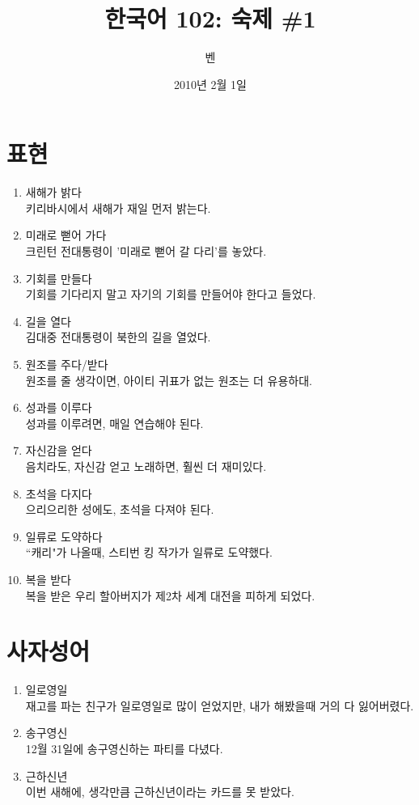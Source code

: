 \documentclass{article}
\title{한국어 102: 숙제 \#1}
\author{벤}
\date{2010년 2월 1일}
\begin{document}
\maketitle
\thispagestyle{empty}
\pagestyle{empty}

\section{표현}
\begin{enumerate}
  \item 새해가 밝다 \\
키리바시에서 새해가 재일 먼저 밝는다.

  \item 미래로 뻗어 가다 \\
크린턴 전대통령이 '미래로 뻗어 갈 다리'를 놓았다.

  \item 기회를 만들다 \\
기회를 기다리지 말고 자기의 기회를 만들어야 한다고 들었다.

  \item 길을 열다 \\
김대중 전대통령이 북한의 길을 열었다.

  \item 원조를 주다/받다 \\
원조를 줄 생각이면, 아이티 귀표가 없는 원조는 더 유용하대.

  \item 성과를 이루다 \\
성과를 이루려면, 매일 연습해야 된다.

  \item 자신감을 얻다 \\
음치라도, 자신감 얻고 노래하면, 훨씬 더 재미있다.

  \item 초석을 다지다 \\
으리으리한 성에도,  초석을 다져야 된다.

  \item 일류로 도약하다 \\
``캐리"가 나올때, 스티번 킹 작가가 일류로 도약했다.

  \item 복을 받다 \\
복을 받은 우리 할아버지가 제2차 세계 대전을 피하게 되었다.
\end{enumerate}

\section{사자성어}
\begin{enumerate}
  \item 일로영일 \\
재고를 파는 친구가 일로영일로 많이 얻었지만, 내가 해봤을때 거의 다 잃어버렸다.

  \item 송구영신 \\
12월 31일에 송구영신하는 파티를 다녔다.

  \item 근하신년 \\
이번 새해에, 생각만큼 근하신년이라는 카드를 못 받았다.
\end{enumerate}
\end{document}
